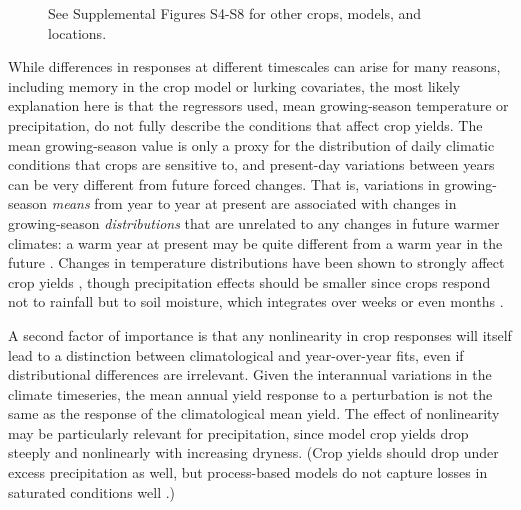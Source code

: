 \documentclass[gmd, manuscript]{copernicus} %
\begin{document}
\begin{figure}[ht]
{       See Supplemental Figures S4-S8 for other crops, models, and locations.
       }
   \label{fig:yearvclim}
\end{figure}


While differences in responses at different timescales %
can arise for many reasons, including memory in the crop model or lurking covariates, the most likely explanation here is that the regressors used, mean growing-season temperature or precipitation, do not fully describe the conditions that affect crop yields. 
The mean growing-season value is only a proxy for the distribution of daily climatic conditions that crops are sensitive to, and present-day variations between years can be very different from future forced changes. 
That is, variations in growing-season \textit{means} from year to year at present are associated with changes in growing-season \textit{distributions} that are unrelated to any changes in future warmer climates: a warm year at present may be quite different from a warm year in the future \citep[e.g.][]{Ruane2016}. %
Changes in temperature distributions have been shown to strongly affect crop yields \citep[e.g.][]{Hansen2000, Gadgil2002}, though precipitation effects should be smaller since crops respond not to rainfall but to soil moisture, which integrates over weeks or even months \citep[e.g.][]{potter2005effects, Glotter14, CHALLINOR200499}. 

A second factor of importance is that any nonlinearity in crop responses will itself lead to a distinction between climatological and year-over-year fits, even if distributional differences are irrelevant. 
Given the interannual variations in the climate timeseries, the mean annual yield response to a perturbation is not the same as the response of the climatological mean yield. 
The effect of nonlinearity may be particularly relevant for precipitation, since model crop yields drop steeply and nonlinearly with increasing dryness. 
(Crop yields should drop under excess precipitation as well, but process-based models do not capture losses in saturated conditions well \citep[e.g.][]{Glotter15,Li2019}.) 
\end{document}
